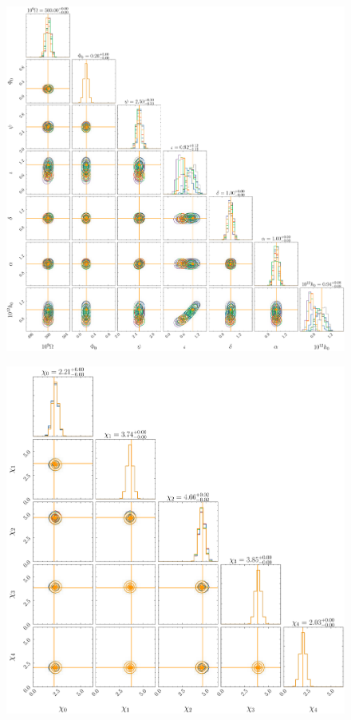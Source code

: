 \documentclass[fleqn,usenatbib,useAMS]{mnras}
\begin{document}
		\begin{figure}
	\includegraphics[width=\textwidth, height = \textwidth ]{images/corner_highSNR} 	
	\caption{}
	\label{fig:corner_high_snr_appendix}
\end{figure}






	\begin{figure}
	\includegraphics[width=\columnwidth, height = \columnwidth ]{images/corner_highSNR_chi} 	
	\caption{}
	\label{fig:corner_high_snr_appendix_chi}
\end{figure}
\end{document}

